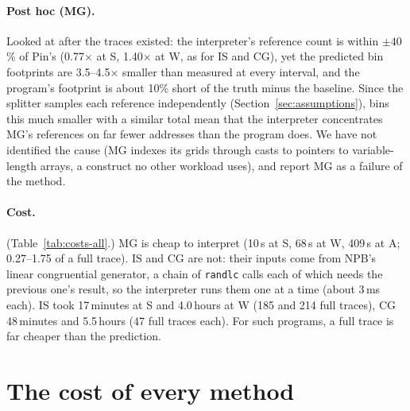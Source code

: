 \documentclass[11pt]{article}
\newcommand{\fittable}[1]{\sbox{\fitbox}{}%
  \ifdim\wd\fitbox>\linewidth\resizebox{\linewidth}{!}{\usebox{\fitbox}}\else\usebox{\fitbox}\fi}
\newcommand{\code}[1]{\texttt{#1}}
\newcommand{\secref}[1]{Section~\ref{#1}}
\newcommand{\tabref}[1]{Table~\ref{#1}}
\begin{document}
\begin{table}[!htbp]
\centering\small
\caption[Second blind test: NPB]{The second blind test: committed predictions against Pin. ``Program part'' is the
interpreter's spectrum; the rest is the runtime baseline.}
\label{tab:blind2}
\fittable{tables/blind2.tex}
\end{table}

\paragraph{Post hoc (MG).} Looked at after the traces existed: the interpreter's reference count is within $\pm40$\%
of Pin's (0.77$\times$ at S, 1.40$\times$ at W, as for IS and CG), yet the predicted bin footprints are 3.5--4.5$\times$
smaller than measured at every interval, and the program's footprint is about 10\% short of the truth minus the
baseline. Since the splitter samples each reference independently (\secref{sec:assumptions}), bins this much smaller
with a similar total mean that the interpreter concentrates MG's references on far fewer addresses than the program
does. We have not identified the cause (MG indexes its grids through casts to pointers to variable-length arrays,
a construct no other workload uses), and report MG as a failure of the method.

\paragraph{Cost.} (\tabref{tab:costs-all}.) MG is cheap to interpret (10\,s at S, 68\,s at W, 409\,s at A; 0.27--1.75
of a full trace). IS and CG are not: their inputs come from NPB's linear congruential generator, a chain of
\code{randlc} calls each of which needs the previous one's result, so the interpreter runs them one at a time (about
3\,ms each). IS took 17\,minutes at S and 4.0\,hours at W (185 and 214 full traces), CG 48\,minutes and 5.5\,hours
(47 full traces each). For such programs, a full trace is far cheaper than the prediction.

\clearpage
\section{The cost of every method}
\label{sec:costs-all}
\end{document}

